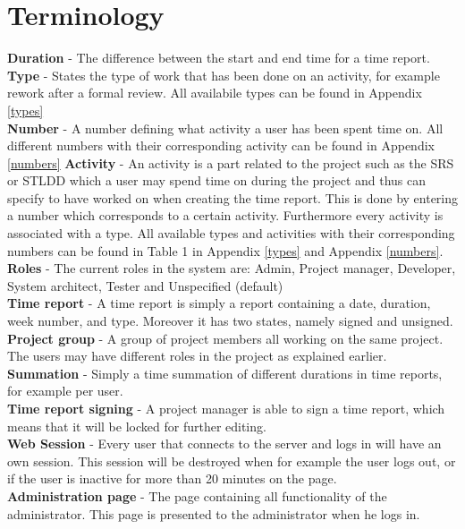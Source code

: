 \documentclass{article}
\begin{document}
\section{Terminology}
\textbf{Duration} - The difference between the start and end time for a time report. \\
\textbf{Type} - States the type of work that has been done on an activity, for example rework after a formal review. All availabile types can be found in Appendix \ref{types}\\
\textbf{Number} - A number defining what activity a user has been spent time on. All different numbers with their corresponding activity can be found in Appendix \ref{numbers}
\textbf{Activity} - An activity is a part related to the project such as the SRS or STLDD which a user may spend time on during the project and thus can specify to have worked on when creating the time report. This is done by entering a number which corresponds to a certain activity. Furthermore every activity is associated with a type. All available types and activities with their corresponding numbers can be found in Table 1 in Appendix \ref{types} and Appendix \ref{numbers}.  \\
\textbf{Roles} - The current roles in the system are: Admin, Project manager, Developer, System architect, Tester and Unspecified (default) \\
\textbf{Time report} - A time report is simply a report containing a date, duration, week number, and type. Moreover it has two states, namely signed and unsigned. \\
\textbf{Project group} - A group of project members all working on the same project. The users may have different roles in the project as explained earlier.  \\
\textbf{Summation} - Simply a time summation of different durations in time reports, for example per user. \\
\textbf{Time report signing} - A project manager is able to sign a time report, which means that it will be locked for further editing. \\
\textbf{Web Session} - Every user that connects to the server and logs in will have an own session. This session will be destroyed when for example the user logs out, or if the user is inactive for more than 20 minutes on the page. \\
\textbf{Administration page} - The page containing all functionality of the administrator. This page is presented to the administrator when he logs in.\\
\end{document}

